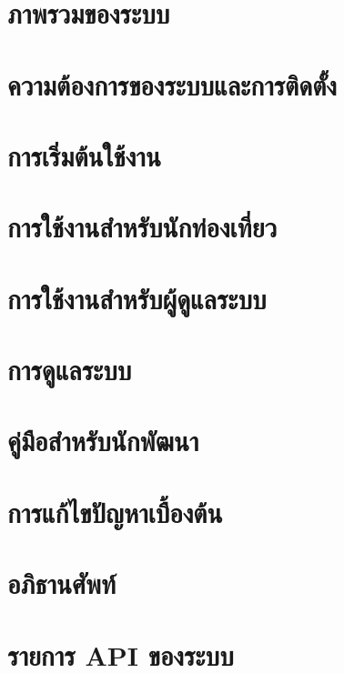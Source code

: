 \documentclass{cskkumanual}
\begin{document}
\makecover
\frontmatter

\begin{preface}       %

\end{preface}

\makecontents         %


\mainmatter

\chapter{ภาพรวมของระบบ}


\chapter{ความต้องการของระบบและการติดตั้ง}


\chapter{การเริ่มต้นใช้งาน}


\chapter{การใช้งานสำหรับนักท่องเที่ยว}


\chapter{การใช้งานสำหรับผู้ดูแลระบบ}


\chapter{การดูแลระบบ}


\chapter{คู่มือสำหรับนักพัฒนา}


\chapter{การแก้ไขปัญหาเบื้องต้น}


\printreferences

\appendix             %
\chapter{อภิธานศัพท์}


\chapter{รายการ API ของระบบ}

\end{document}
